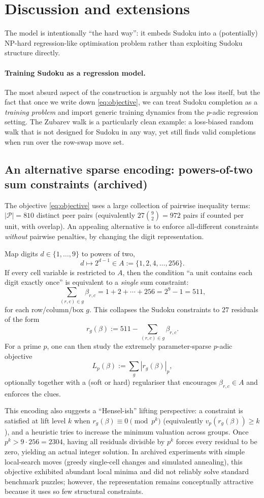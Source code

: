 \documentclass[11pt]{article}
\begin{document}
\section{Discussion and extensions}
The model is intentionally ``the hard way'': it embeds Sudoku into a (potentially) NP-hard regression-like optimisation problem rather than exploiting Sudoku structure directly.

\paragraph{Training Sudoku as a regression model.}
The most absurd aspect of the construction is arguably not the loss itself, but the fact that once we write down \eqref{eq:objective}, we can treat Sudoku completion as a \emph{training problem} and import generic training dynamics from the $p$-adic regression setting. The Zubarev walk is a particularly clean example: a loss-biased random walk that is not designed for Sudoku in any way, yet still finds valid completions when run over the row-swap move set.

\subsection{An alternative sparse encoding: powers-of-two sum constraints (archived)}
The objective \eqref{eq:objective} uses a large collection of pairwise inequality terms: $|\mathcal{P}|=810$ distinct peer pairs (equivalently $27\binom{9}{2}=972$ pairs if counted per unit, with overlap). An appealing alternative is to enforce all-different constraints \emph{without} pairwise penalties, by changing the digit representation.

Map digits $d\in\{1,\dots,9\}$ to powers of two,
\[
d \longmapsto 2^{d-1} \in A := \{1,2,4,\dots,256\}.
\]
If every cell variable is restricted to $A$, then the condition ``a unit contains each digit exactly once'' is equivalent to a \emph{single} sum constraint:
\[
\sum_{(r,c)\in g} \beta_{r,c} = 1+2+\cdots+256 = 2^9-1 = 511,
\]
for each row/column/box $g$. This collapses the Sudoku constraints to $27$ residuals of the form
\[
r_g(\beta) := 511 - \sum_{(r,c)\in g}\beta_{r,c}.
\]
For a prime $p$, one can then study the extremely parameter-sparse $p$-adic objective
\[
L_p(\beta) := \sum_g |r_g(\beta)|_p,
\]
optionally together with a (soft or hard) regulariser that encourages $\beta_{r,c}\in A$ and enforces the clues.

This encoding also suggests a ``Hensel-ish'' lifting perspective: a constraint is satisfied at lift level $k$ when $r_g(\beta)\equiv 0\pmod{p^k}$ (equivalently $v_p(r_g(\beta))\ge k$), and a heuristic tries to increase the minimum valuation across groups. Once $p^k > 9\cdot 256 = 2304$, having all residuals divisible by $p^k$ forces every residual to be zero, yielding an actual integer solution. In archived experiments with simple local-search moves (greedy single-cell changes and simulated annealing), this objective exhibited abundant local minima and did not reliably solve standard benchmark puzzles; however, the representation remains conceptually attractive because it uses so few structural constraints.
\end{document}
